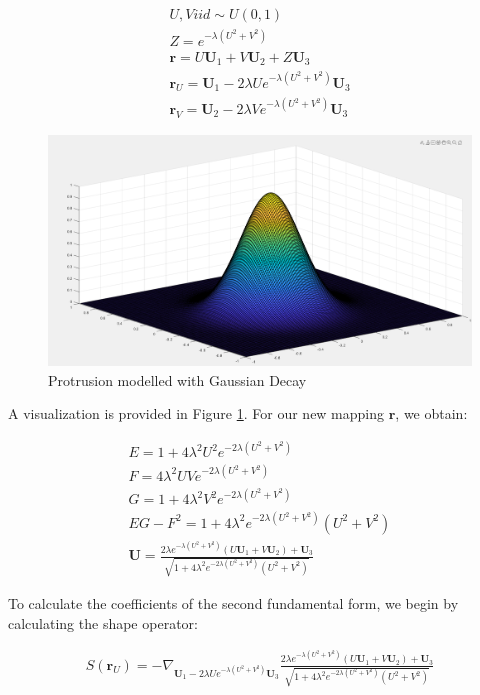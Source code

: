\documentclass[preprint,12pt]{elsarticle}
\newcounter{bla}
\begin{document}
\begin{gather}
	U, V iid \sim U(0,1) \\	
	Z = e^{-\lambda(U^2 + V^2)} \\
	\mathbf{r} = U \mathbf{U}_1 + V \mathbf{U}_2 + Z \mathbf{U}_3 \\
	\mathbf{r}_U = \mathbf{U}_1 - 2\lambda U e^{-\lambda(U^2 + V^2)}\mathbf{U}_3 \\
	\mathbf{r}_V = \mathbf{U}_2 - 2\lambda V e^{-\lambda(U^2 + V^2)}\mathbf{U}_3
\end{gather}

\begin{figure}
\includegraphics[width=15cm]{gaussian_protrusion}
\caption{Protrusion modelled with Gaussian Decay}
\label{fig:gaussian_protrusion}
\end{figure}

A visualization is provided in Figure \ref{fig:gaussian_protrusion}. For our new mapping $\mathbf{r}$, we obtain:

\begin{gather}
	E = 1 + 4 \lambda^{2} U^{2} e^{-2\lambda(U^2 + V^2)} \\
	F = 4 \lambda^{2} U V e^{-2\lambda(U^2 + V^2)} \\
	G = 1 + 4 \lambda^{2} V^{2} e^{-2\lambda(U^2 + V^2)} \\
	EG - F^{2} = 1 + 4\lambda^{2} e^{-2\lambda(U^2 + V^2)}(U^2 + V^2) \\
	\mathbf{U} = \frac{2\lambda e^{-\lambda(U^2 + V^2)}(U\mathbf{U}_1 + V\mathbf{U}_2) + \mathbf{U}_3}{\sqrt{1 + 4\lambda^{2} e^{-2\lambda(U^2 + V^2)}(U^2 + V^2)}}
\end{gather}

To calculate the coefficients of the second fundamental form, we begin by calculating the shape operator:

\begin{gather}
	S(\mathbf{r}_U) = -\nabla_{\mathbf{U}_1 - 2\lambda U e^{-\lambda(U^2 + V^2)}\mathbf{U}_3} \frac{2\lambda e^{-\lambda(U^2 + V^2)}(U\mathbf{U}_1 + V\mathbf{U}_2) + \mathbf{U}_3}{\sqrt{1 + 4\lambda^{2} e^{-2\lambda(U^2 + V^2)}(U^2 + V^2)}} \\
\end{gather}
\end{document}
